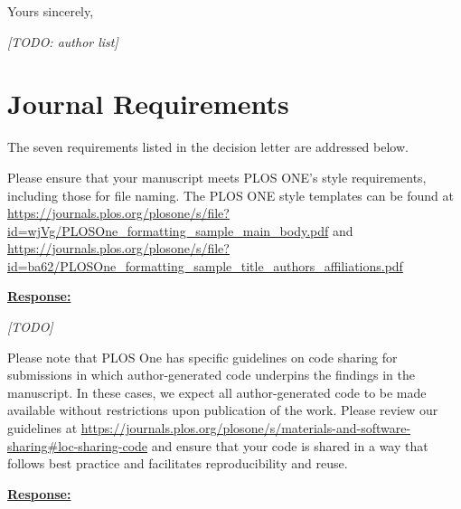 \documentclass{article}
\begin{document}
\vspace{0.4cm}
\noindent
Yours sincerely,

\vspace{0.2cm}
\noindent
\emph{[TODO: author list]}


\newpage
\setcounter{tcb@cnt@cmt}{0}
\section*{Journal Requirements}

\noindent
The seven requirements listed in the decision letter are addressed below.

\vspace{0.3cm}

\begin{cmt}{}{}

Please ensure that your manuscript meets PLOS ONE's style requirements,
including those for file naming. The PLOS ONE style templates can be found at
\url{https://journals.plos.org/plosone/s/file?id=wjVg/PLOSOne_formatting_sample_main_body.pdf}
and
\url{https://journals.plos.org/plosone/s/file?id=ba62/PLOSOne_formatting_sample_title_authors_affiliations.pdf}

\end{cmt}
\vspace{0.1cm}
\noindent
\underline{\textbf{Response:}}
\vspace{0.2cm}

\emph{[TODO]}

\vspace{0.3cm}


\begin{cmt}{}{}

Please note that PLOS One has specific guidelines on code sharing for
submissions in which author-generated code underpins the findings in the
manuscript. In these cases, we expect all author-generated code to be made
available without restrictions upon publication of the work. Please review our
guidelines at
\url{https://journals.plos.org/plosone/s/materials-and-software-sharing#loc-sharing-code}
and ensure that your code is shared in a way that follows best practice and
facilitates reproducibility and reuse.

\end{cmt}
\vspace{0.1cm}
\noindent
\underline{\textbf{Response:}}
\vspace{0.2cm}
\end{document}
